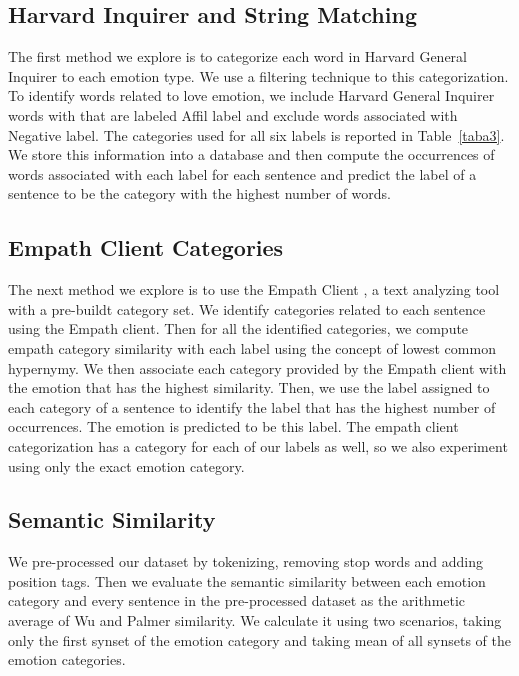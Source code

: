 \documentclass[conference]{IEEEtran}
\begin{document}
\subsection{Harvard Inquirer and String Matching}
The first method we explore is to categorize each word in Harvard General Inquirer \cite{harvardgeneralinquirer} to each emotion type. We use a filtering technique to this categorization. To identify words related to love emotion, we include Harvard General Inquirer words with that are labeled Affil label and exclude words associated with Negative label. The categories used for all six labels is reported in Table~\ref{taba3}. We store this information into a database and then compute the occurrences of words associated with each label for each sentence and predict the label of a sentence to be the category with the highest number of words.

\subsection{Empath Client Categories}
The next method we explore is to use the Empath Client \cite{empathclient}, a text analyzing tool with a pre-buildt category set. We identify categories related to each sentence using the Empath client. Then for all the identified categories, we compute empath category similarity with each label using the concept of lowest common hypernymy. We then associate each category provided by the Empath client with the emotion that has the highest similarity. Then, we use the label assigned to each category of a sentence to identify the label that has the highest number of occurrences. The emotion is predicted to be this label. The empath client categorization has a category for each of our labels as well, so we also experiment using only the exact emotion category.
\subsection{Semantic Similarity}
We pre-processed our dataset by tokenizing, removing stop words and adding position tags. Then we evaluate the semantic similarity between each emotion category and every sentence in the pre-processed dataset as the arithmetic average of Wu and Palmer similarity. We calculate it using two scenarios, taking only the first synset of the emotion category and taking mean of all synsets of the emotion categories.
\end{document}

